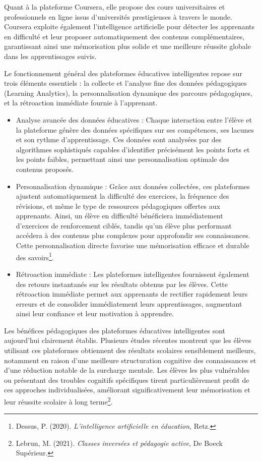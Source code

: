\documentclass[11pt,a4paper]{report}
\begin{document}
Quant à la plateforme Coursera, elle propose des cours universitaires et professionnels en ligne issus d’universités prestigieuses à travers le monde. Coursera exploite également l’intelligence artificielle pour détecter les apprenants en difficulté et leur proposer automatiquement des contenus complémentaires, garantissant ainsi une mémorisation plus solide et une meilleure réussite globale dans les apprentissages suivis.

Le fonctionnement général des plateformes éducatives intelligentes repose sur trois éléments essentiels : la collecte et l’analyse fine des données pédagogiques (Learning Analytics), la personnalisation dynamique des parcours pédagogiques, et la rétroaction immédiate fournie à l’apprenant.

\begin{itemize}

    \item Analyse avancée des données éducatives :
Chaque interaction entre l’élève et la plateforme génère des données spécifiques sur ses compétences, ses lacunes et son rythme d’apprentissage. Ces données sont analysées par des algorithmes sophistiqués capables d’identifier précisément les points forts et les points faibles, permettant ainsi une personnalisation optimale des contenus proposés.

    \item Personnalisation dynamique :
Grâce aux données collectées, ces plateformes ajustent automatiquement la difficulté des exercices, la fréquence des révisions, et même le type de ressources pédagogiques offertes aux apprenants. Ainsi, un élève en difficulté bénéficiera immédiatement d’exercices de renforcement ciblés, tandis qu’un élève plus performant accédera à des contenus plus complexes pour approfondir ses connaissances. Cette personnalisation directe favorise une mémorisation efficace et durable des savoirs\footnote{Dessus, P. (2020). \textit{L’intelligence artificielle en éducation}, Retz.}.

    \item Rétroaction immédiate :
Les plateformes intelligentes fournissent également des retours instantanés sur les résultats obtenus par les élèves. Cette rétroaction immédiate permet aux apprenants de rectifier rapidement leurs erreurs et de consolider immédiatement leurs apprentissages, augmentant ainsi leur confiance et leur motivation à apprendre.
\end{itemize}

Les bénéfices pédagogiques des plateformes éducatives intelligentes sont aujourd’hui clairement établis. Plusieurs études récentes montrent que les élèves utilisant ces plateformes obtiennent des résultats scolaires sensiblement meilleurs, notamment en raison d’une meilleure structuration cognitive des connaissances et d’une réduction notable de la surcharge mentale. Les élèves les plus vulnérables ou présentant des troubles cognitifs spécifiques tirent particulièrement profit de ces approches individualisées, améliorant significativement leur mémorisation et leur réussite scolaire à long terme\footnote{Lebrun, M. (2021). \textit{Classes inversées et pédagogie active}, De Boeck Supérieur.}.
\end{document}
